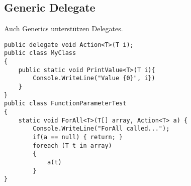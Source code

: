 \subsection{Generic Delegate}
Auch Generics unterstützen Delegates.

\begin{lstlisting}
public delegate void Action<T>(T i);
public class MyClass
{
	public static void PrintValue<T>(T i){ 
		Console.WriteLine("Value {0}", i}) 
	}
}
public class FunctionParameterTest
{
	static void ForAll<T>(T[] array, Action<T> a) {
		Console.WriteLine("ForAll called...");
		if(a == null) { return; }
		foreach (T t in array)
		{
			a(t)
		}
}
\end{lstlisting}
